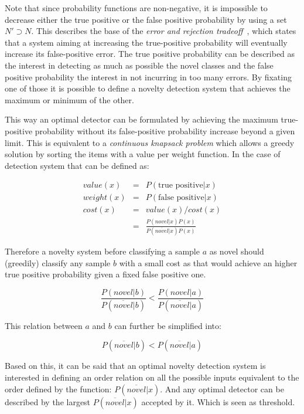 Note that since probability functions are non-negative, it is impossible to decrease either the
true positive or the false positive probability by using a set $N' \supset N$.
This describes the base of the \emph{error and rejection tradeoff}~\cite{chow1970optimum}, which
states that a system aiming at increasing the true-positive probability will eventually increase its
false-positive error.
The true positive probability can be described as the interest in detecting as much
as possible the novel classes and the false positive probability the interest
in not incurring in too many errors.
By fixating one of those it is possible to define a novelty detection
system that achieves the maximum or minimum of the other.

This way an optimal detector can be formulated by achieving the maximum true-positive
probability without its false-positive probability increase beyond a given limit.
This is equivalent to a \emph{continuous knapsack problem} which allows a greedy
solution by sorting the items with a value per weight function.
In the case of detection system that can be defined as:

\begin{eqnarray}
value(x)  &=& P(\text{true positive}|x) \\
weight(x) &=& P(\text{false positive}|x) \\
cost(x)   &=& value(x)/cost(x) \\
          &=& \frac{P(novel|x)P(x)}{P(\overline{novel}|x)P(x)}
\end{eqnarray}

Therefore a novelty system before classifying a sample $a$ as novel should (greedily)
classify any sample $b$ with a small cost as that would achieve
an higher true positive probability given a fixed false positive one.

\begin{equation}
\label{eq:knapsack}
\frac{P(novel|b)}{P(\overline{novel}|b)} < \frac{P(novel|a)}{P(\overline{novel}|a)}
\end{equation}

This relation between $a$ and $b$ can further be simplified into:

\begin{equation}
P(\overline{novel}|b) < P(\overline{novel}|a)
\end{equation}


Based on this, it can be said that an optimal novelty detection system is
interested in defining an order relation on all the possible inputs equivalent
to the order defined by the function: $P(\overline{novel}|x)$.
And any optimal detector can be described by the largest $P(\overline{novel}|x)$
accepted by it. Which is seen as threshold.


